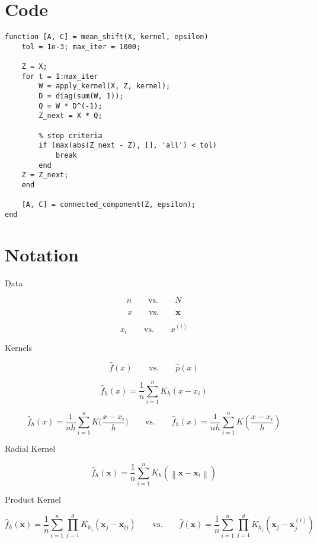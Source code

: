 \documentclass{article}
\newcommand{\norm}[1]{\left\lVert#1\right\rVert}
\begin{document}




\appendix


\section{Code}

\begin{lstlisting}
function [A, C] = mean_shift(X, kernel, epsilon)
    tol = 1e-3; max_iter = 1000;
	
    Z = X;
    for t = 1:max_iter        
        W = apply_kernel(X, Z, kernel);
        D = diag(sum(W, 1));
        Q = W * D^(-1);
        Z_next = X * Q;

        % stop criteria
        if (max(abs(Z_next - Z), [], 'all') < tol)
            break
        end
    Z = Z_next;
    end

    [A, C] = connected_component(Z, epsilon);
end
\end{lstlisting}


\section{Notation}

Data

\[
n\qquad \text{vs.} \qquad N
\]

\[
x\qquad \text{vs.} \qquad \bm{x}
\]

\[
x_i\qquad \text{vs.} \qquad x^{(i)}
\]

Kernels

\[
\hat{f}(x)\qquad \text{vs.} \qquad \hat{p}(x)
\]

\[
\hat{f}_h(x) = \frac{1}{n} \sum_{i=1}^n K_h(x - x_i)
\]

\[
\hat{f}_h(x) = \frac{1}{nh} \sum_{i=1}^n K\biggl(\frac{x - x_i}{h}\biggr)\qquad \text{vs.} \qquad \hat{f}_h(x) = \frac{1}{nh} \sum_{i=1}^n K\left(\frac{x - x_i}{h}\right)
\]

Radial Kernel

\[
\hat{f}_h(\bm{x}) = \frac{1}{n} \sum_{i=1}^{n} K_h(\norm{\bm{x} -\bm{x}_i})
\]

Product Kernel

\[
\hat{f}_h(\bm{x}) = \frac{1}{n} \sum_{i=1}^{n} \prod_{j=1}^d K_{h_j}(\bm{x}_j -\bm{x}_{ij})\qquad \text{vs.} \qquad \hat{f}(\bm{x}) = \frac{1}{n} \sum_{i=1}^{n} \prod_{j=1}^d K_{h_j}(\bm{x}_j -\bm{x}_j^{(i)})
\]
\end{document}
